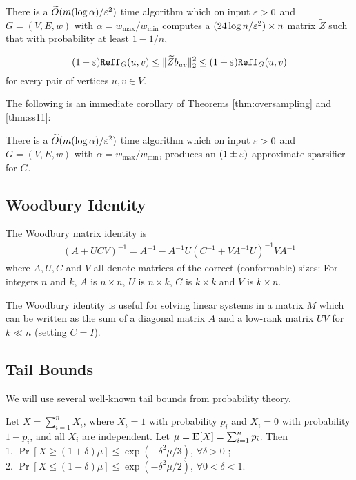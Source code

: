\begin{theorem}\label{thm:ss11}
There is a $\widetilde{O}(m(\log \alpha)/\varepsilon^2)$ time algorithm which on input $\varepsilon > 0$ and $G = (V,E,w)$ with $\alpha = w_{\max}/w_{\min}$ computes a $(24 \log n/\varepsilon^2)\times n$ matrix $\tilde{Z}$ such that with probability at least $1 - 1/n$,

$$(1 - \varepsilon) \mathtt{Reff}_G(u,v) \le \|\widetilde{Z}b_{uv}\|_2^2 \le (1 + \varepsilon) \mathtt{Reff}_G(u,v)$$
for every pair of vertices $u,v\in V$.
\end{theorem}

The following is an immediate corollary of Theorems \ref{thm:oversampling} and \ref{thm:ss11}:

\begin{corollary}[\cite{ss11}]\label{cor:ss11}
There is a $\widetilde{O}(m(\log \alpha)/\varepsilon^2)$ time algorithm which on input $\varepsilon > 0$ and $G = (V,E,w)$ with $\alpha = w_{\max}/w_{\min}$, produces an $(1 \pm \varepsilon)$-approximate sparsifier for $G$.
\end{corollary}

\subsection{Woodbury Identity}\label{sec:woodbury_identity}

\begin{proposition}[\cite{w49,w50}]\label{prop:woodbury}
The Woodbury matrix identity is
\begin{align*}
(A+ U C V)^{-1} = A^{-1} - A^{-1} U (C^{-1} + V A^{-1} U)^{-1} V A^{-1}
\end{align*}
where $A, U, C$ and $V$ all denote matrices of the correct (conformable) sizes: For integers $n$ and $k$, $A$ is $n\times n$, $U$ is $n\times k$, $C$ is $k \times k$ and $V$ is $k \times n$.
\end{proposition}

The Woodbury identity is useful for solving linear systems in a matrix $M$ which can be written as the sum of a diagonal matrix $A$ and a low-rank matrix $UV$ for $k\ll n$ (setting $C=I$).

\subsection{Tail Bounds}

We will use several well-known tail bounds from probability theory.
\begin{theorem}\label{thm:chernoff}
Let $X = \sum_{i=1}^n X_i$, where $X_i=1$ with probability $p_i$ and $X_i = 0$ with probability $1-p_i$, and all $X_i$ are independent. Let $\mu = \mathbf{E}[X] = \sum_{i=1}^n p_i$. Then \\
1. $ \Pr[ X \geq (1+\delta) \mu ] \leq \exp ( - \delta^2 \mu / 3 ) $, $\forall \delta > 0$ ; \\
2. $ \Pr[ X \leq (1-\delta) \mu ] \leq \exp ( - \delta^2 \mu / 2 ) $, $\forall 0 < \delta < 1$. 
\end{theorem}

